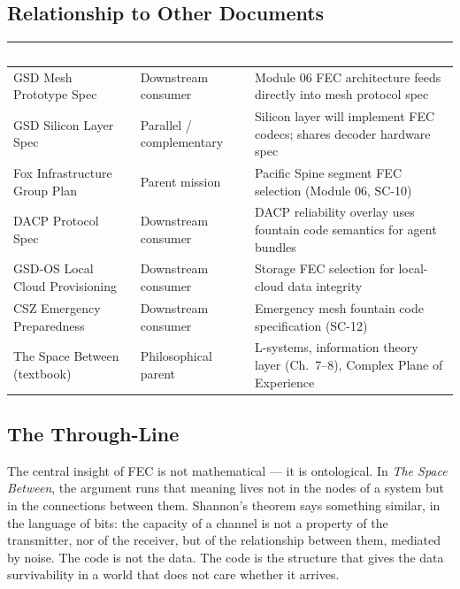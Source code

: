 \documentclass[11pt,letterpaper]{article}
\newcommand{\tableheader}[1]{\textbf{\sffamily\textcolor{white}{#1}}}
\begin{document}
\subsection{Relationship to Other Documents}

\begin{center}
\begin{tabularx}{\textwidth}{L{4.5cm}L{2.5cm}X}
\toprule
{}
\tableheader{Document} & \tableheader{Relationship} & \tableheader{Integration Point} \\
\midrule
GSD Mesh Prototype Spec & Downstream consumer & Module 06 FEC architecture feeds directly into mesh protocol spec \\
GSD Silicon Layer Spec & Parallel / complementary & Silicon layer will implement FEC codecs; shares decoder hardware spec \\
Fox Infrastructure Group Plan & Parent mission & Pacific Spine segment FEC selection (Module 06, SC-10) \\
DACP Protocol Spec & Downstream consumer & DACP reliability overlay uses fountain code semantics for agent bundles \\
GSD-OS Local Cloud Provisioning & Downstream consumer & Storage FEC selection for local-cloud data integrity \\
CSZ Emergency Preparedness & Downstream consumer & Emergency mesh fountain code specification (SC-12) \\
The Space Between (textbook) & Philosophical parent & L-systems, information theory layer (Ch.\ 7--8), Complex Plane of Experience \\
\bottomrule
\end{tabularx}
\end{center}

\subsection{The Through-Line}

The central insight of FEC is not mathematical --- it is ontological. In \textit{The Space Between}, the argument runs that meaning lives not in the nodes of a system but in the connections between them. Shannon's theorem says something similar, in the language of bits: the capacity of a channel is not a property of the transmitter, nor of the receiver, but of the relationship between them, mediated by noise. The code is not the data. The code is the structure that gives the data survivability in a world that does not care whether it arrives.
\end{document}
